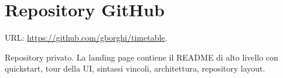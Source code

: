 \chapter{Repository GitHub}
\label{ch:repository_github}

URL: \url{https://github.com/gborghi/timetable}.

Repository privato. La landing page contiene il README di alto
livello con quickstart, tour della UI, sintassi vincoli,
architettura, repository layout.


